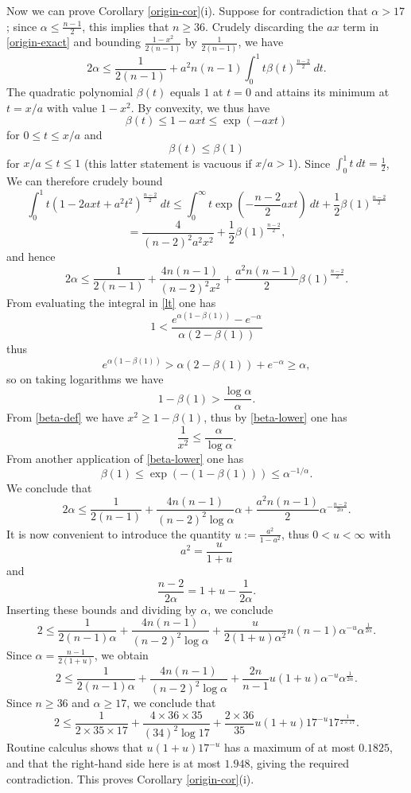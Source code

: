 \documentclass[12pt]{article}
\begin{document}
Now we can prove Corollary \ref{origin-cor}(i). Suppose for contradiction that $\alpha > 17$; since $\alpha \leq \frac{n-1}{2}$, this implies that $n \geq 36$.
Crudely discarding the $ax$ term in \eqref{origin-exact} and bounding $\frac{1-x^2}{2(n-1)}$ by $\frac{1}{2(n-1)}$, we have
$$ 2 \alpha \leq \frac{1}{2(n-1)} + a^2 n(n-1) \int_0^1 t \beta(t)^{\frac{n-2}{2}}\ dt.$$
The quadratic polynomial $\beta(t)$ equals $1$ at $t=0$ and attains its minimum at $t = x/a$ with value $1-x^2$.  By convexity, we thus have
\begin{equation}\label{ax}
 \beta(t) \leq 1 - axt \leq \exp(-axt) 
\end{equation}
for $0 \leq t \leq x/a$ and
\begin{equation}\label{tax}
 \beta(t) \leq \beta(1)
\end{equation}
for $x/a \leq t \leq 1$ (this latter statement is vacuous if $x/a > 1$).  Since $\int_0^1 t\ dt = \frac{1}{2}$,  We can therefore crudely bound
$$
\int_0^1 t (1 - 2 a x t + a^2 t^2)^{\frac{n-2}{2}}\ dt \leq \int_0^\infty t \exp( - \frac{n-2}{2} axt)\ dt + \frac{1}{2} \beta(1)^{\frac{n-2}{2}} $$
$$ = \frac{4}{(n-2)^2 a^2 x^2} + \frac{1}{2} \beta(1)^{\frac{n-2}{2}},$$
and hence
$$ 2 \alpha \leq \frac{1}{2(n-1)} + \frac{4n(n-1)}{(n-2)^2 x^2} + \frac{a^2 n(n-1)}{2} \beta(1)^{\frac{n-2}{2}}.$$
From evaluating the integral in \eqref{lt} one has
$$1 < \frac{e^{\alpha (1 - \beta(1))}- e^{-\alpha}}{\alpha (2 - \beta(1))}$$
thus
$$ e^{\alpha (1 - \beta(1))} > \alpha (2 - \beta(1)) + e^{-\alpha} \geq \alpha,$$
so on taking logarithms we have
\begin{equation}\label{beta-lower}
1 - \beta(1) > \frac{\log \alpha}{\alpha}.
\end{equation}
From \eqref{beta-def} we have $x^2 \geq 1-\beta(1)$, thus by \eqref{beta-lower} one has
$$ \frac{1}{x^2} \leq \frac{\alpha}{\log \alpha}.$$
From another application of \eqref{beta-lower} one has
$$ \beta(1) \leq \exp( - (1 - \beta(1)) ) \leq \alpha^{-1/\alpha}.$$
We conclude that
$$ 2 \alpha \leq \frac{1}{2(n-1)} + \frac{4n(n-1)}{(n-2)^2 \log \alpha} \alpha + \frac{a^2 n(n-1)}{2} \alpha^{-\frac{n-2}{2\alpha}}.$$
It is now convenient to introduce the quantity $u := \frac{a^2}{1-a^2}$, thus $0 < u < \infty$ with
$$ a^2 = \frac{u}{1+u}$$
and
$$ \frac{n-2}{2 \alpha} = 1 + u - \frac{1}{2\alpha}.$$
Inserting these bounds and dividing by $\alpha$, we conclude
$$ 2 \leq \frac{1}{2(n-1) \alpha} + \frac{4n(n-1)}{(n-2)^2 \log \alpha} + \frac{u}{2(1+u) \alpha^2} n(n-1) \alpha^{-u} \alpha^{\frac{1}{2\alpha}}.$$
Since $\alpha = \frac{n-1}{2(1+u)}$, we obtain
$$ 2 \leq \frac{1}{2(n-1) \alpha} + \frac{4n(n-1)}{(n-2)^2 \log \alpha} + \frac{2n}{n-1} u (1+u) \alpha^{-u} \alpha^{\frac{1}{2\alpha}}.$$
Since $n \geq 36$ and $\alpha \geq 17$, we conclude that
$$ 2 \leq \frac{1}{2 \times 35 \times 17} + \frac{4 \times 36 \times 35}{(34)^2 \log 17} + \frac{2 \times 36}{35} u (1+u) 17^{-u} 17^{\frac{1}{2 \times 17}}.$$
Routine calculus shows that $u(1+u) 17^{-u}$ has a maximum of at most $0.1825$, and that the right-hand side here is at most $1.948$, giving the required contradiction.  This proves Corollary \ref{origin-cor}(i).
\end{document}
